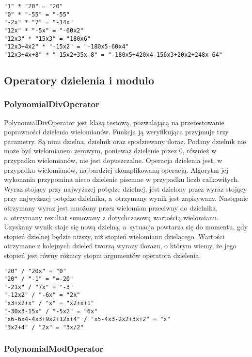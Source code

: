 \begin{lstlisting}
"1" * "20" = "20"
"0" * "-55" = "-55"
"-2x" * "7" = "-14x"
"12x" * "-5x" = "-60x2"
"12x3" * "15x3" = "180x6"
"12x3+4x2" * "-15x2" = "-180x5-60x4"
"12x3+4x+8" * "-15x2+35x-8" = "-180x5+420x4-156x3+20x2+248x-64"
\end{lstlisting}

\subsection{Operatory dzielenia i modulo}

\subsubsection{PolynomialDivOperator}

PolynomialDivOperator jest klasą testową, pozwalającą na przetestowanie poprawności dzielenia wielomianów. Funkcja ją weryfikująca przyjmuje trzy parametry. Są nimi dzielna, dzielnik oraz spodziewany iloraz. Podany dzielnik nie może być wielomianem zerowym, ponieważ dzielenie przez $0$, również w przypadku wielomianów, nie jest dopuszczalne. Operacja dzielenia jest, w przypadku wielomianów, najbardziej skomplikowaną operacją. Algorytm jej wykonania przypomina nieco dzielenie pisemne w przypadku liczb całkowitych. Wyraz stojący przy najwyższej potędze dzielnej, jest dzielony przez wyraz stojący przy najwyższej potędze dzielnika, a~otrzymany wynik jest zapisywany. Następnie otrzymany wyraz jest mnożony przez wielomian przeciwny do dzielnika, a~otrzymany rezultat sumowany z dotychczasową wartością wielomianu. Uzyskany wynik staje się nową dzielną, a~sytuacja powtarza się do momentu, gdy stopień dzielnej będzie niższy, niż stopień wielomianu dzielącego. Wartości otrzymane z kolejnych dzieleń tworzą wyrazy ilorazu, o którym wiemy, że jego stopień jest równy różnicy stopni argumentów operatora dzielenia.

\begin{lstlisting}
"20" / "20x" = "0"
"20" / "-1" = "=-20"
"-21x" / "7x" = "-3"
"-12x2" / "-6x" = "2x"
"x3+x2+x" / "x" = "x2+x+1"
"-30x3-15x" / "-5x2" = "6x"
"x6-6x4-4x3+9x2+12x+4" / "x5-4x3-2x2+3x+2" = "x"
"3x2+4" / "2x" = "3x/2"
\end{lstlisting}

\subsubsection{PolynomialModOperator}

